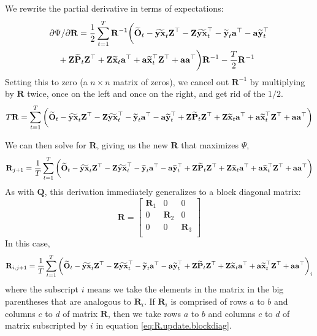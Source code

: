 \documentclass[]{article}
\def\XI{\mbox{\boldmath $\Xi$}}
\def\OO{\mbox{$\mathbf O$}}
\def\PP{\mbox{$\mathbf P$}}  \def\pp{\mbox{$\mathbf p$}}
\def\QQ{\mbox{$\mathbf Q$}}	 \def\qq{\mbox{$\mathbf q$}} \def\Qb{\mbox{$\mathbf G$}}  \def\Qm{\mathbb{Q}}
\def\RR{\mbox{$\mathbf R$}}	 \def\rr{\mbox{$\mathbf r$}} \def\Rb{\mbox{$\mathbf H$}}	\def\Rm{\mathbb{R}}
\def\ZZ{\mbox{$\mathbf Z$}}	\def\zz{\mbox{$\mathbf z$}}	\def\Zb{\mbox{$\mathbf M$}} \def\Za{\mbox{$\mathbf N$}} \def\Zm{\XI}
\def\hatxt{\widetilde{\mbox{$\mathbf x$}}_t}
\def\hatyt{\widetilde{\mbox{$\mathbf y$}}_t}
\def\hatOt{\widetilde{\OO}_t}
\def\hatYXt{\widetilde{\mbox{$\mathbf{y}\mathbf{x}$}}_t}
\def\hatPt{\widetilde{\PP}_t}
\begin{document}
We rewrite the partial derivative in terms of expectations:
\begin{equation}\label{eq:R.unconstrained4}
\begin{split}
&\partial\Psi/\partial\RR = \frac{1}{2} \sum_{t=1}^T \RR^{-1} \bigg( 
\hatOt - \hatYXt\ZZ^\top - \ZZ\hatYXt^\top 
 - \hatyt\aa^\top - \aa\hatyt^\top \\
&\quad + \ZZ\hatPt\ZZ^\top + \ZZ\hatxt\aa^\top + \aa\hatxt^\top\ZZ^\top + \aa\aa^\top \bigg)\RR^{-1} - \frac{T}{2}\RR^{-1} 
\end{split}
\end{equation}
Setting this to zero (a $n \times n$ matrix of zeros), we cancel out $\RR^{-1}$ by multiplying by $\RR$ twice, once on the left and once on the right, and get rid of the $1/2$. 
\begin{equation}\label{eq:R.unconstrained5}
\begin{split}
T\RR = \sum_{t=1}^T \bigg(  
\hatOt - \hatYXt\ZZ^\top - \ZZ\hatYXt^\top 
 - \hatyt\aa^\top - \aa\hatyt^\top 
 + \ZZ\hatPt\ZZ^\top + \ZZ\hatxt\aa^\top + \aa\hatxt^\top\ZZ^\top 
+ \aa\aa^\top \bigg)  
\end{split}
\end{equation}

We can then solve for $\RR$, giving us the new $\RR$ that maximizes $\Psi$, 
\begin{equation}\label{eq:R.update.unconstrained}
\begin{split}
\RR_{j+1} = \frac{1}{T}\sum_{t=1}^T \bigg(  
 \hatOt - \hatYXt\ZZ^\top - \ZZ\hatYXt^\top 
 - \hatyt\aa^\top - \aa\hatyt^\top 
 + \ZZ\hatPt\ZZ^\top + \ZZ\hatxt\aa^\top + \aa\hatxt^\top\ZZ^\top 
 + \aa\aa^\top \bigg)
\end{split}
\end{equation}
As with $\QQ$, this derivation immediately generalizes to a block diagonal matrix:
\begin{equation*}
\RR =
\begin{bmatrix}
\RR_1&0&0\\
0&\RR_2&0\\
0&0&\RR_3\\
\end{bmatrix}
\end{equation*}
In this case,
\begin{equation}\label{eq:R.update.blockdiag}
\begin{split}
\RR_{i,j+1} = \frac{1}{T}\sum_{t=1}^T \bigg(  
 \hatOt - \hatYXt\ZZ^\top - \ZZ\hatYXt^\top 
 - \hatyt\aa^\top - \aa\hatyt^\top 
 + \ZZ\hatPt\ZZ^\top + \ZZ\hatxt\aa^\top + \aa\hatxt^\top\ZZ^\top 
 + \aa\aa^\top \bigg)_i
\end{split}
\end{equation}
where the subscript $i$ means we take the elements in the matrix in the big parentheses that are analogous to $\RR_i$.  If $\RR_i$ is comprised of rows $a$ to $b$ and columns $c$ to $d$ of matrix $\RR$, then we take rows $a$ to $b$ and columns $c$ to $d$ of matrix subscripted by $i$ in equation \ref{eq:R.update.blockdiag}.
\end{document}
